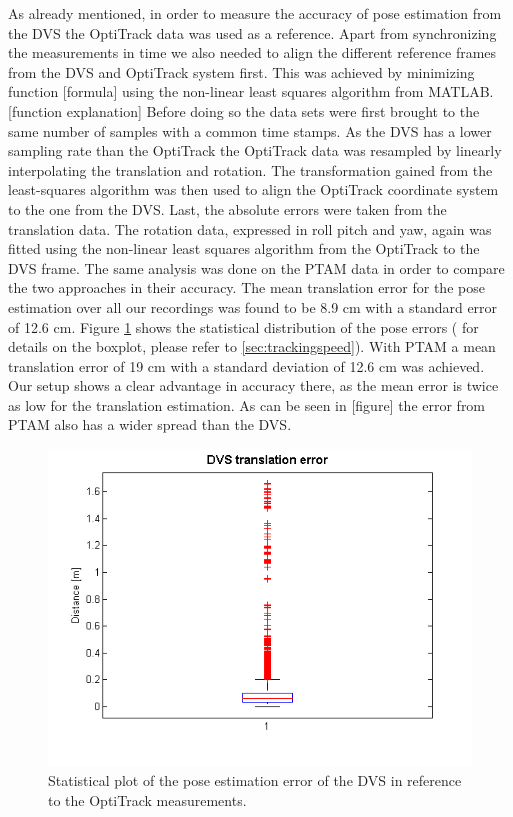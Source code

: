 As already mentioned, in order to measure the accuracy of pose estimation from the DVS the OptiTrack data was used as a reference. Apart from synchronizing the measurements in time we also needed to align the different reference frames from the DVS and OptiTrack system first. This was achieved by minimizing function [formula] using the non-linear least squares algorithm from MATLAB. [function explanation] Before doing so the data sets were first brought to the same number of samples with a common time stamps. As the DVS has a lower sampling rate than the OptiTrack the OptiTrack data was resampled by linearly interpolating the translation and rotation. The transformation gained from the least-squares algorithm was then used to align the OptiTrack coordinate system to the one from the DVS. Last, the absolute errors were taken from the translation data. The rotation data, expressed in roll pitch and yaw, again was fitted using the non-linear least squares algorithm from the OptiTrack to the DVS frame. The same analysis was done on the PTAM data in order to compare the two approaches in their accuracy. The mean translation error for the pose estimation over all our recordings was found to be 8.9 cm with a standard error of 12.6 cm. Figure \ref{img:dvs_pose_error_plot} shows the statistical distribution of the pose errors ( for details on the boxplot, please refer to \ref{sec:trackingspeed}). With PTAM a mean translation error of 19 cm with a standard deviation of 12.6 cm was achieved. Our setup shows a clear advantage in accuracy there, as the mean error is twice as low for the translation estimation. As can be seen in [figure] the error from PTAM also has a wider spread than the DVS.

\begin{figure}[h]
     \centering
     \includegraphics[width=1.0\textwidth]{img/dvs_trans_error_box.png}
     \caption{Statistical plot of the pose estimation error of the DVS in reference to the OptiTrack measurements.}
     \label{img:dvs_pose_error_plot}
\end{figure}

